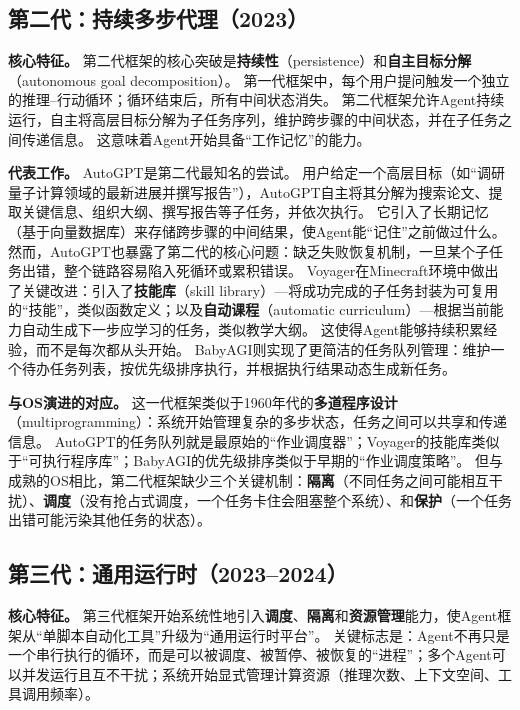 \subsection*{第二代：持续多步代理（2023）}

\textbf{核心特征。}
第二代框架的核心突破是\textbf{持续性}（persistence）和\textbf{自主目标分解}（autonomous goal decomposition）。
第一代框架中，每个用户提问触发一个独立的推理--行动循环；循环结束后，所有中间状态消失。
第二代框架允许Agent持续运行，自主将高层目标分解为子任务序列，维护跨步骤的中间状态，并在子任务之间传递信息。
这意味着Agent开始具备``工作记忆''的能力。

\textbf{代表工作。}
AutoGPT\cite{autogpt_repo_2026}是第二代最知名的尝试。
用户给定一个高层目标（如``调研量子计算领域的最新进展并撰写报告''），AutoGPT自主将其分解为搜索论文、提取关键信息、组织大纲、撰写报告等子任务，并依次执行。
它引入了长期记忆（基于向量数据库）来存储跨步骤的中间结果，使Agent能``记住''之前做过什么。
然而，AutoGPT也暴露了第二代的核心问题：缺乏失败恢复机制，一旦某个子任务出错，整个链路容易陷入死循环或累积错误。
Voyager\cite{wang2023voyager}在Minecraft环境中做出了关键改进：引入了\textbf{技能库}（skill library）---将成功完成的子任务封装为可复用的``技能''，类似函数定义；以及\textbf{自动课程}（automatic curriculum）---根据当前能力自动生成下一步应学习的任务，类似教学大纲。
这使得Agent能够持续积累经验，而不是每次都从头开始。
BabyAGI则实现了更简洁的任务队列管理：维护一个待办任务列表，按优先级排序执行，并根据执行结果动态生成新任务。

\textbf{与OS演进的对应。}
这一代框架类似于1960年代的\textbf{多道程序设计}（multiprogramming）：系统开始管理复杂的多步状态，任务之间可以共享和传递信息。
AutoGPT的任务队列就是最原始的``作业调度器''；Voyager的技能库类似于``可执行程序库''；BabyAGI的优先级排序类似于早期的``作业调度策略''。
但与成熟的OS相比，第二代框架缺少三个关键机制：\textbf{隔离}（不同任务之间可能相互干扰）、\textbf{调度}（没有抢占式调度，一个任务卡住会阻塞整个系统）、和\textbf{保护}（一个任务出错可能污染其他任务的状态）。

\subsection*{第三代：通用运行时（2023--2024）}

\textbf{核心特征。}
第三代框架开始系统性地引入\textbf{调度}、\textbf{隔离}和\textbf{资源管理}能力，使Agent框架从``单脚本自动化工具''升级为``通用运行时平台''。
关键标志是：Agent不再只是一个串行执行的循环，而是可以被调度、被暂停、被恢复的``进程''；多个Agent可以并发运行且互不干扰；系统开始显式管理计算资源（推理次数、上下文空间、工具调用频率）。

